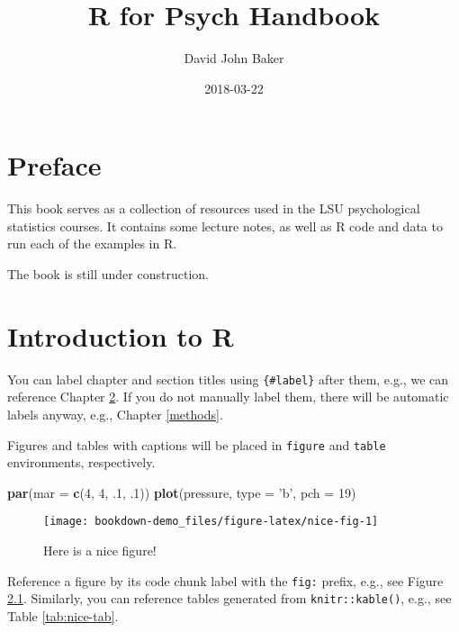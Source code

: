 \documentclass[]{book}
\title{R for Psych Handbook}
\author{David John Baker}
\date{2018-03-22}
\newenvironment{Shaded}{\begin{snugshade}}{\end{snugshade}}
\newcommand{\KeywordTok}[1]{\textcolor[rgb]{0.13,0.29,0.53}{\textbf{#1}}}
\newcommand{\DataTypeTok}[1]{\textcolor[rgb]{0.13,0.29,0.53}{#1}}
\newcommand{\DecValTok}[1]{\textcolor[rgb]{0.00,0.00,0.81}{#1}}
\newcommand{\StringTok}[1]{\textcolor[rgb]{0.31,0.60,0.02}{#1}}
\newcommand{\NormalTok}[1]{#1}
\theoremstyle{definition}
\theoremstyle{definition}
\theoremstyle{definition}
\theoremstyle{remark}
\begin{document}
\maketitle

{
\setcounter{tocdepth}{1}
\tableofcontents
}
\chapter{Preface}\label{preface}

This book serves as a collection of resources used in the LSU
psychological statistics courses. It contains some lecture notes, as
well as R code and data to run each of the examples in R.

The book is still under construction.

\chapter{Introduction to R}\label{intro}

You can label chapter and section titles using \texttt{\{\#label\}}
after them, e.g., we can reference Chapter \ref{intro}. If you do not
manually label them, there will be automatic labels anyway, e.g.,
Chapter \ref{methods}.

Figures and tables with captions will be placed in \texttt{figure} and
\texttt{table} environments, respectively.

\begin{Shaded}
\begin{Highlighting}[]
\KeywordTok{par}\NormalTok{(}\DataTypeTok{mar =} \KeywordTok{c}\NormalTok{(}\DecValTok{4}\NormalTok{, }\DecValTok{4}\NormalTok{, .}\DecValTok{1}\NormalTok{, .}\DecValTok{1}\NormalTok{))}
\KeywordTok{plot}\NormalTok{(pressure, }\DataTypeTok{type =} \StringTok{'b'}\NormalTok{, }\DataTypeTok{pch =} \DecValTok{19}\NormalTok{)}
\end{Highlighting}
\end{Shaded}

\begin{figure}

{\centering \texttt{[image: bookdown-demo\_files/figure-latex/nice-fig-1]} 

}

\caption{Here is a nice figure!}\label{fig:nice-fig}
\end{figure}

Reference a figure by its code chunk label with the \texttt{fig:}
prefix, e.g., see Figure \ref{fig:nice-fig}. Similarly, you can
reference tables generated from \texttt{knitr::kable()}, e.g., see Table
\ref{tab:nice-tab}.
\end{document}
